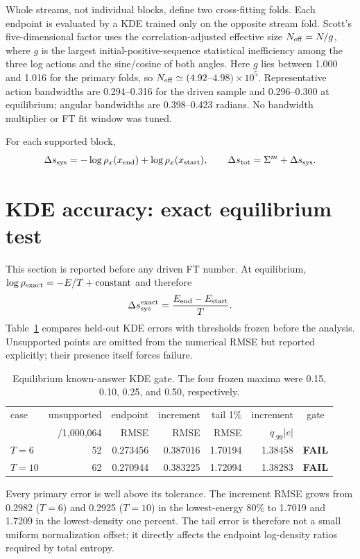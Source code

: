 \documentclass[11pt]{article}
\newcommand{\fail}{\textcolor{red!70!black}{\textbf{FAIL}}}
\begin{document}
Whole streams, not individual blocks, define two cross-fitting folds.  Each
endpoint is evaluated by a KDE trained only on the opposite stream fold.
Scott's five-dimensional factor uses the correlation-adjusted effective size
$N_{\rm eff}=N/g$, where $g$ is the largest initial-positive-sequence
statistical inefficiency among the three log actions and the sine/cosine of
both angles.  Here $g$ lies between 1.000 and 1.016 for the primary folds, so
$N_{\rm eff}\simeq(4.92$--$4.98)\times10^5$.  Representative action
bandwidths are 0.294--0.316 for the driven sample and 0.296--0.300 at
equilibrium; angular bandwidths are 0.398--0.423 radians.  No bandwidth
multiplier or FT fit window was tuned.

For each supported block,
\[
\Delta s_{\rm sys}=-\log\rho_x(x_{\rm end})+\log\rho_x(x_{\rm start}),
\qquad
\Delta s_{\rm tot}=\Sigma^m+\Delta s_{\rm sys}.
\]

\section{KDE accuracy: exact equilibrium test}

This section is reported before any driven FT number.  At equilibrium,
$\log\rho_{\rm exact}=-E/T+\text{constant}$ and therefore
\[
\Delta s_{\rm sys}^{\rm exact}=\frac{E_{\rm end}-E_{\rm start}}{T}.
\]
Table~\ref{tab:kde-gate} compares held-out KDE errors with thresholds frozen
before the analysis.  Unsupported points are omitted from the numerical RMSE
but reported explicitly; their presence itself forces failure.

\begin{table}[ht]
\centering
\caption{Equilibrium known-answer KDE gate.  The four frozen maxima were
0.15, 0.10, 0.25, and 0.50, respectively.}
\label{tab:kde-gate}
\small
\begin{tabular}{lrrrrr c}
\toprule
case & unsupported & endpoint & increment & tail 1\% & increment & gate\\
 & /1,000,064 & RMSE & RMSE & RMSE & $q_{.99}|e|$ & \\
\midrule
$T=6$  & 52 & 0.273456 & 0.387016 & 1.70194 & 1.38458 & \fail\\
$T=10$ & 62 & 0.270944 & 0.383225 & 1.72094 & 1.38283 & \fail\\
\bottomrule
\end{tabular}
\end{table}

Every primary error is well above its tolerance.  The increment RMSE grows
from 0.2982 ($T=6$) and 0.2925 ($T=10$) in the lowest-energy 80\% to 1.7019
and 1.7209 in the lowest-density one percent.  The tail error is therefore not
a small uniform normalization offset; it directly affects the endpoint
log-density ratios required by total entropy.
\end{document}
